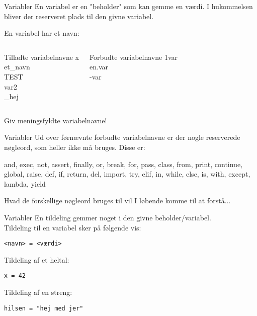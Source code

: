 \begin{frame}{Variabler}
En variabel er en "beholder" som kan gemme en værdi. I hukommelsen bliver der reserveret plads til den givne variabel.


En variabel har et navn:
	\begin{columns}
		\begin{exampleblock}{Tilladte variabelnavne}
		x\\et\_navn\\TEST\\var2\\\_hej
		\end{exampleblock}

		\begin{alertblock}{Forbudte variabelnavne}
		1var\\en.var\\-var
		\end{alertblock}
	\end{columns}
	\vfill
	Giv meningsfyldte variabelnavne!
\end{frame}

\begin{frame}{Variabler}
	Ud over førnævnte forbudte variabelnavne er der nogle reserverede nøgleord, som heller ikke må bruges.
	\vfill
	Disse er: \\
		\begin{Large}
			and, exec, not, assert,	finally, or, break, for, pass, class, from, print, continue, global, raise, def, if, return, del, import, try, elif, in, while, else, is, with, except, lambda,	yield		
		\end{Large}
	\vfill
	Hvad de forskellige nøgleord bruges til vil I løbende komme til at forstå...
\end{frame}

\begin{frame}[fragile]{Variabler}
	En tildeling gemmer noget i den givne beholder/variabel.\\
	Tildeling til en variabel sker på følgende vis:
	\begin{lstlisting}[style=python]
<navn> = <værdi>
	\end{lstlisting}
	Tildeling af et heltal:
	\begin{lstlisting}[style=python]
x = 42
	\end{lstlisting}
	Tildeling af en streng:
	\begin{lstlisting}[style=python]
hilsen = "hej med jer"
	\end{lstlisting}
\end{frame}

